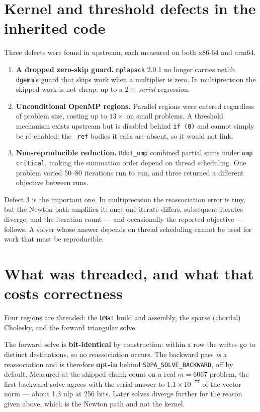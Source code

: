 \documentclass[11pt]{article}
\newcommand{\code}[1]{\texttt{#1}}
\begin{document}
\section{Kernel and threshold defects in the inherited code}

Three defects were found in upstream, each measured on both x86-64 and arm64.

\begin{enumerate}
  \item \textbf{A dropped zero-skip guard.} \code{mplapack} 2.0.1 no longer carries netlib
    \code{dgemm}'s guard that skips work when a multiplier is zero. In multiprecision the skipped
    work is not cheap: up to a $2\times$ \emph{serial} regression.
  \item \textbf{Unconditional OpenMP regions.} Parallel regions were entered regardless of problem
    size, costing up to $13\times$ on small problems. A threshold mechanism exists upstream but is
    disabled behind \code{if (0)} and cannot simply be re-enabled: the \code{\_ref} bodies it calls
    are absent, so it would not link.
  \item \textbf{Non-reproducible reduction.} \code{Rdot\_omp} combined partial sums under
    \code{omp critical}, making the summation order depend on thread scheduling. One problem
    varied 50--80 iterations run to run, and three returned a different objective between runs.
\end{enumerate}

Defect 3 is the important one. In multiprecision the reassociation error is tiny, but the Newton
path amplifies it: once one iterate differs, subsequent iterates diverge, and the iteration count
--- and occasionally the reported objective --- follows. A solver whose answer depends on thread
scheduling cannot be used for work that must be reproducible.

\section{What was threaded, and what that costs correctness}

Four regions are threaded: the \code{bMat} build and assembly, the sparse (chordal) Cholesky,
and the forward triangular solve.

The forward solve is \textbf{bit-identical} by construction: within a row the writes go to
distinct destinations, so no reassociation occurs. The backward pass \emph{is} a reassociation
and is therefore \textbf{opt-in} behind \code{SDPA\_SOLVE\_BACKWARD}, off by default. Measured at
the shipped chunk count on a real $m=6067$ problem, the first backward solve agrees with the
serial answer to $1.1\times 10^{-77}$ of the vector norm --- about 1.3 ulp at 256 bits. Later
solves diverge further for the reason given above, which is the Newton path and not the kernel.
\end{document}
